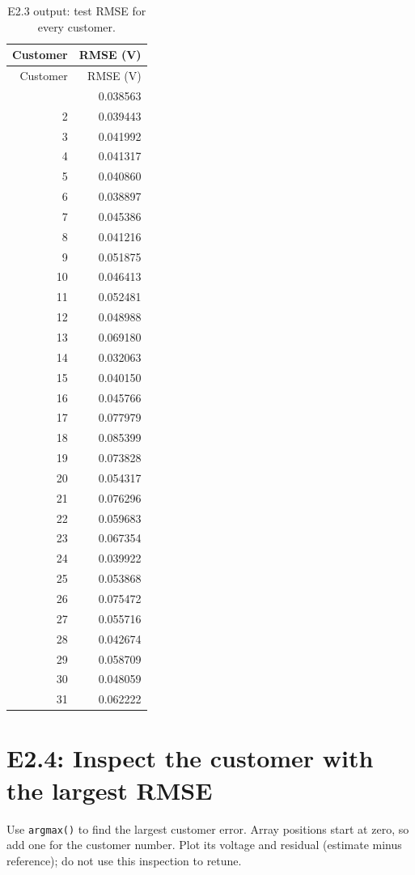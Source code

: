 \documentclass[11pt,a4paper]{article}
\begin{document}
\begin{longtable}{rr}
\caption{E2.3 output: test RMSE for every customer.}\\
\toprule Customer & RMSE (V) \\ \midrule
\endfirsthead
\toprule Customer & RMSE (V) \\ \midrule
\endhead
\bottomrule\endfoot
1 & 0.038563 \\
2 & 0.039443 \\
3 & 0.041992 \\
4 & 0.041317 \\
5 & 0.040860 \\
6 & 0.038897 \\
7 & 0.045386 \\
8 & 0.041216 \\
9 & 0.051875 \\
10 & 0.046413 \\
11 & 0.052481 \\
12 & 0.048988 \\
13 & 0.069180 \\
14 & 0.032063 \\
15 & 0.040150 \\
16 & 0.045766 \\
17 & 0.077979 \\
18 & 0.085399 \\
19 & 0.073828 \\
20 & 0.054317 \\
21 & 0.076296 \\
22 & 0.059683 \\
23 & 0.067354 \\
24 & 0.039922 \\
25 & 0.053868 \\
26 & 0.075472 \\
27 & 0.055716 \\
28 & 0.042674 \\
29 & 0.058709 \\
30 & 0.048059 \\
31 & 0.062222 \\
\end{longtable}

\clearpage
\section*{E2.4: Inspect the customer with the largest RMSE}
Use \texttt{argmax()} to find the largest customer error. Array positions
start at zero, so add one for the customer number. Plot its voltage and
residual (estimate minus reference); do not use this inspection to retune.
\end{document}
